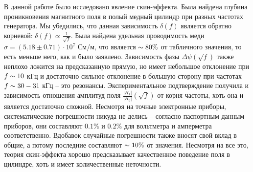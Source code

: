 	В данной работе было исследовано явление скин-эффекта. Была найдена глубина проникновения магнитного поля в полый медный цилиндр при разных частотах генератора. Мы убедились, что данная зависимость $\delta (f)$ является обратно корневой: $\delta (f) \propto \frac{1}{\sqrt{f}}$. Была найдена удельная проводимость меди $\sigma = (5.18 \pm 0.71)\cdot 10^7$ См/м, что является $\thicksim 80\%$ от табличного значения, то есть меньше него, как и было заявлено. Зависимость фазы $\Delta \psi (\sqrt{f})$ также неплохо ложится на предсказанную прямую, но имеет небольшое отклонение при $f \thicksim 10$ кГц и достаточно сильное отклонение в большую сторону при частотах $f \thicksim 30-31$ кГц -- это резонансы. Экспериментальное подтверждение получила и зависимость отношения амплитуд поля $\frac{|H_1|}{|H_0|}(\sqrt{f})$ от корня частоты, хоть она и является достаточно сложной. Несмотря на точные электронные приборы, систематические погрешности никуда не делись -- согласно паспортным данным приборов, они составляют $0.1\%$ и $0.2\%$ для вольтметра и амперметра соответственно. Вдобавок случайные погрешности также вносят свой вклад в общие, а потому последние составляют $\thicksim 10\%$ от значения. Несмотря на все это, теория скин-эффекта хорошо предсказывает качественное поведение поля в цилиндре, хоть и имеет количественные неточности.
    
